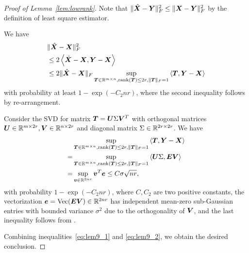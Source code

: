 \documentclass[journal]{IEEEtran}
\theoremstyle{definition}
\theoremstyle{definition}
\newcommand{\ang}[1]{\left\langle#1\right\rangle}
\begin{document}
\begin{proof}[Proof of Lemma~\ref{lem:lowrank}] Note that $\lVert\hat {\bm X} - \bm Y\rVert_F^2 \leq \lVert\bm X - \bm Y\rVert_F^2$ by the definition of least square estimator. 
{ 

We have 
\small
        \begin{align}
            &\onormSize{}{\hat \mX - \mX}_F^2\\
            & \leq 2 \ang{ \hat \mX - \mX, \mY - \mX} \\ & \leq 2 \onormSize{}{\hat \mX - \mX}_F \sup_{\mT \in \bbR^{m \times n}, \text{rank}(\mT) \leq 2r, \onormSize{}{\mT}_F = 1} \ang{\mT, \mY - \mX} \label{eq:lem9_1}
        \end{align}
        \normalsize
        with probability at least $1 - \exp(-C_2 nr)$, where the second inequality follows by re-arrangement.
        
        Consider the SVD for matrix $\bm T = \bm{U} \Sigma \bm{V}^T$ with orthogonal matrices $\bm{U} \in \mathbb{R}^{m \times 2r}, \bm{V} \in \mathbb{R}^{n \times 2r}$ and diagonal matrix $\Sigma \in \mathbb{R}^{2r \times 2r}$. We have 
        \begin{align}
            &\sup_{\mT \in \bbR^{m \times n}, \text{rank}(\mT) \leq 2r, \onormSize{}{\mT}_F = 1} \ang{\mT, \mY - \mX} \\
            =& \sup_{\mT \in \bbR^{m \times n}, \text{rank}(\mT) \leq 2r, \onormSize{}{\mT}_F = 1} \ang{\mU \Sigma, \mE \mV} \\
            =&  \sup_{\mv \in \bbR^{2nr}} \mv^T \me \leq C \sigma \sqrt{nr}, \label{eq:lem9_2}
        \end{align}
        with probability $1 - \exp(-C_2 nr)$, where $C, C_2$ are two positive constants, the vectorization $\bm{e} = \text{Vec}(\bm{E} \bm{V}) \in \mathbb{R}^{2nr}$ has independent mean-zero sub-Gaussian entries with bounded variance $\sigma^2$ due to the orthogonality of $\bm{V}$, and the last inequality follows from \cite[Theorem 1.19]{rigollet2015high}.

        Combining inequalities~\eqref{eq:lem9_1} and \eqref{eq:lem9_2}, we obtain the desired conclusion.
        }

\end{proof}
\end{document}

